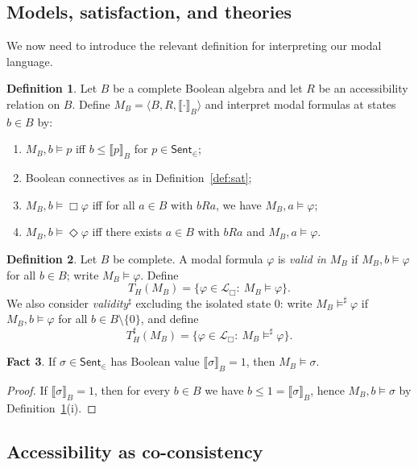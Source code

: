 \documentclass[11pt]{amsart}
\theoremstyle{definition}
\newtheorem{definition}{Definition}[section]
\newtheorem{fact}[definition]{Fact}
\theoremstyle{plain}
\newcommand{\Sent}{\mathsf{Sent}}
\newcommand{\Lbox}{\mathcal L_{\Box}} %
\newcommand{\val}[1]{\llbracket #1\rrbracket_B}
\begin{document}
\subsection{Models, satisfaction, and theories}

We now need to introduce the relevant definition for interpreting our modal language.

\begin{definition}\label{def:MB}
Let $B$ be a complete Boolean algebra and let $R$ be an accessibility relation on $B$.
Define $M_B=\langle B,R,\val{\cdot}\rangle$ and interpret modal formulas at states $b\in B$ by:
\begin{enumerate}[label=(\roman*)]
\item $M_B,b\models p$ iff $b\le \val{p}$ for $p\in\Sent_{\in}$;
\item Boolean connectives as in Definition~\ref{def:sat};
\item $M_B,b\models \Box\varphi$ iff for all $a\in B$ with $bRa$, we have $M_B,a\models \varphi$;
\item $M_B,b\models \Diamond\varphi$ iff there exists $a\in B$ with $bRa$ and $M_B,a\models\varphi$.
\end{enumerate}
\end{definition}

\begin{definition}\label{def:theories}
Let $B$ be complete.
A modal formula $\varphi$ is \emph{valid in $M_B$} if $M_B,b\models\varphi$ for all $b\in B$; write $M_B\models\varphi$.
Define
\[
T_H(M_B)=\{\varphi\in\Lbox:\ M_B\models\varphi\}.
\]
We also consider \emph{validity}$^\sharp$ excluding the isolated state $0$: write $M_B\models^\sharp\varphi$ if
$M_B,b\models\varphi$ for all $b\in B\setminus\{0\}$, and define
\[
T_H^\sharp(M_B)=\{\varphi\in\Lbox:\ M_B\models^\sharp\varphi\}.
\]
\end{definition}

\begin{fact}\label{fact:zfc-sentences}
If $\sigma\in\Sent_{\in}$ has Boolean value $\val{\sigma}=1$, then $M_B\models \sigma$.
\end{fact}

\begin{proof}
If $\val{\sigma}=1$, then for every $b\in B$ we have $b\le 1=\val{\sigma}$, hence $M_B,b\models\sigma$ by
Definition~\ref{def:MB}(i).
\end{proof}

\subsection{Accessibility as co-consistency}\label{subsec:coconsistency}
\end{document}
